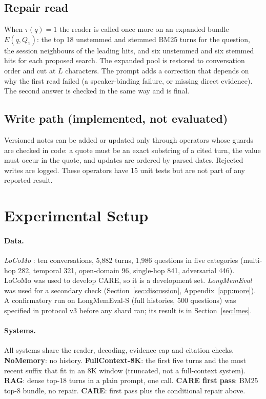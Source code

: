 \documentclass[10pt]{article}
\theoremstyle{plain}
\newcommand{\care}{\textsc{CARE}}
\begin{document}
\subsection{Repair read}

When $\tau(q)=1$ the reader is called once more on an expanded bundle $E(q,Q_1)$: the top 18 unstemmed and stemmed
BM25 turns for the question, the session neighbours of the leading hits, and six unstemmed and six stemmed hits for
each proposed search. The expanded pool is restored to conversation order and cut at $L$ characters. The prompt adds
a correction that depends on why the first read failed (a speaker-binding failure, or missing direct evidence). The
second answer is checked in the same way and is final.

\subsection{Write path (implemented, not evaluated)}

Versioned notes can be added or updated only through operators whose guards are checked in code: a quote must be an
exact substring of a cited turn, the value must occur in the quote, and updates are ordered by parsed dates. Rejected
writes are logged. These operators have 15 unit tests but are not part of any reported result.

\section{Experimental Setup}
\label{sec:setup}

\paragraph{Data.} \emph{LoCoMo} \citep{maharana2024locomo}: ten conversations, 5,882 turns, 1,986 questions in five
categories (multi-hop 282, temporal 321, open-domain 96, single-hop 841, adversarial 446). LoCoMo was used to develop
\care{}, so it is a development set. \emph{LongMemEval} \citep{wu2024longmemeval} was used for a secondary check
(Section~\ref{sec:discussion}, Appendix~\ref{app:more}). A confirmatory run on LongMemEval-S (full histories, 500 questions) was specified in protocol v3 before
any shard ran; its result is in Section~\ref{sec:lmes}.

\paragraph{Systems.} All systems share the reader, decoding, evidence cap and citation checks.
\textbf{NoMemory}: no history. \textbf{FullContext-8K}: the first five turns and the most recent suffix that fit in an
8K window (truncated, not a full-context system). \textbf{RAG}: dense top-18 turns in a plain prompt, one call.
\textbf{\care{} first pass}: BM25 top-8 bundle, no repair. \textbf{\care{}}: first pass plus the conditional repair
above.
\end{document}
